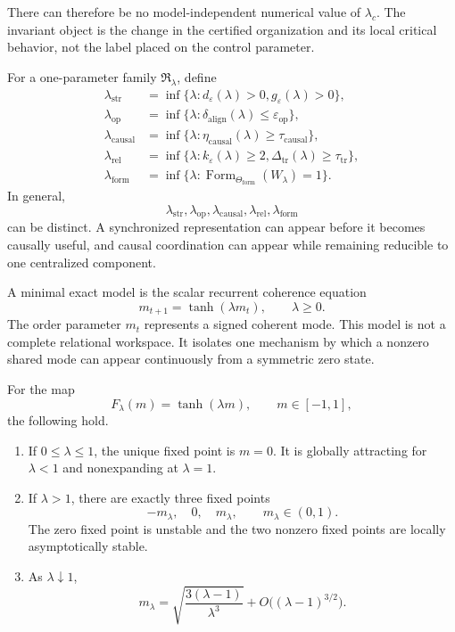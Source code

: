 There can therefore be no model-independent numerical value of \(\lambda_c\).
The invariant object is the change in the certified organization and its local
critical behavior, not the label placed on the control parameter.


For a one-parameter family \(\mathfrak R_\lambda\), define
\[
\begin{aligned}
\lambda_{\mathrm{str}}
&=
\inf\{\lambda:
 d_{\varepsilon}(\lambda)>0,
 g_{\varepsilon}(\lambda)>0\},\\
\lambda_{\mathrm{op}}
&=
\inf\{\lambda:
 \delta_{\mathrm{align}}(\lambda)
 \leq\varepsilon_{\mathrm{op}}\},\\
\lambda_{\mathrm{causal}}
&=
\inf\{\lambda:
 \eta_{\mathrm{causal}}(\lambda)
 \geq\tau_{\mathrm{causal}}\},\\
\lambda_{\mathrm{rel}}
&=
\inf\{\lambda:
 k_\varepsilon(\lambda)\geq2,
 \Delta_{\mathrm{tr}}(\lambda)
 \geq\tau_{\mathrm{tr}}\},\\
\lambda_{\mathrm{form}}
&=
\inf\{\lambda:
 \operatorname{Form}_{\Theta_{\mathrm{form}}}
 (W_\lambda)=1\}.
\end{aligned}
\]
In general,
\[
\lambda_{\mathrm{str}},
\lambda_{\mathrm{op}},
\lambda_{\mathrm{causal}},
\lambda_{\mathrm{rel}},
\lambda_{\mathrm{form}}
\]
can be distinct. A synchronized representation can appear before it becomes
causally useful, and causal coordination can appear while remaining reducible
to one centralized component.


A minimal exact model is the scalar recurrent coherence equation
\[
\boxed{
m_{t+1}=\tanh(\lambda m_t),
\qquad
\lambda\geq0.
}
\]
The order parameter \(m_t\) represents a signed coherent mode. This model is
not a complete relational workspace. It isolates one mechanism by which a
nonzero shared mode can appear continuously from a symmetric zero state.

\begin{SRWTtheorem}\label{SRWT:thm:pitchfork-formation}
For the map
\[
F_\lambda(m)=\tanh(\lambda m),
\qquad
m\in[-1,1],
\]
the following hold.
\begin{enumerate}
\item If \(0\leq\lambda\leq1\), the unique fixed point is \(m=0\).
 It is globally attracting for \(\lambda<1\) and nonexpanding at
 \(\lambda=1\).
\item If \(\lambda>1\), there are exactly three fixed points
 \[
 -m_\lambda,
 \quad0,
 \quad m_\lambda,
 \qquad
 m_\lambda\in(0,1).
 \]
 The zero fixed point is unstable and the two nonzero fixed points are
 locally asymptotically stable.
\item As \(\lambda\downarrow1\),
 \[
 \boxed{
 m_\lambda
 =
 \sqrt{\frac{3(\lambda-1)}{\lambda^3}}
 +
 O\bigl((\lambda-1)^{3/2}\bigr).
 }
 \]
\end{enumerate}
\end{SRWTtheorem}


